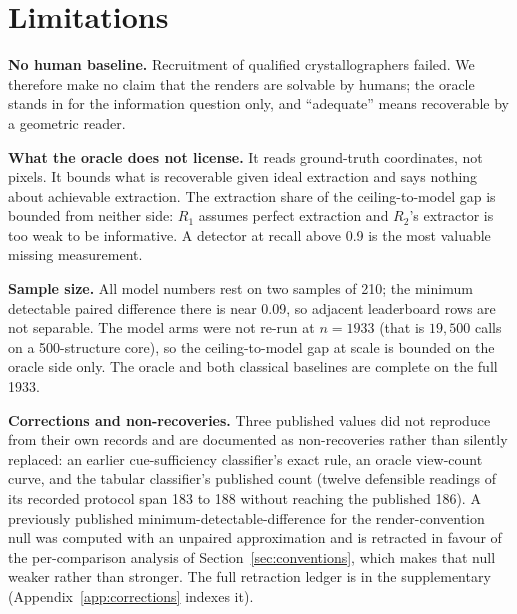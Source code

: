 \section{Limitations}
\textbf{No human baseline.} Recruitment of qualified crystallographers failed. We therefore make no claim
that the renders are solvable by humans; the oracle stands in for the information question only, and
``adequate'' means recoverable by a geometric reader.

\textbf{What the oracle does not license.} It reads ground-truth coordinates, not pixels. It bounds what is
recoverable given ideal extraction and says nothing about achievable extraction. The extraction share of
the ceiling-to-model gap is bounded from neither side: $R_1$ assumes perfect extraction and $R_2$'s
extractor is too weak to be informative. A detector at recall above 0.9 is the most valuable missing
measurement.

\textbf{Sample size.} All model numbers rest on two samples of 210; the minimum detectable paired
difference there is near 0.09, so adjacent leaderboard rows are not separable. The model arms were not
re-run at $n = 1933$ (that is $19{,}500$ calls on a 500-structure core), so the ceiling-to-model gap at
scale is bounded on the oracle side only. The oracle and both classical baselines are complete on the full
1933.

\textbf{Corrections and non-recoveries.} Three published values did not reproduce from their own records
and are documented as non-recoveries rather than silently replaced: an earlier cue-sufficiency classifier's
exact rule, an oracle view-count curve, and the tabular classifier's published count (twelve defensible
readings of its recorded protocol span 183 to 188 without reaching the published 186). A previously
published minimum-detectable-difference for the render-convention null was computed with an unpaired
approximation and is retracted in favour of the per-comparison analysis of Section~\ref{sec:conventions},
which makes that null weaker rather than stronger. The full retraction ledger is in the supplementary
(Appendix~\ref{app:corrections} indexes it).
